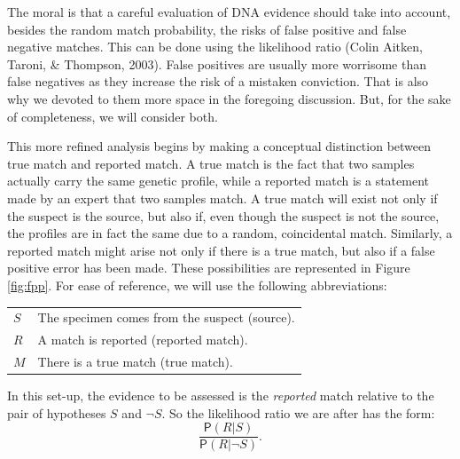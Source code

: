 \documentclass[
  10pt,
  dvipsnames,enabledeprecatedfontcommands]{scrartcl}
\newcommand{\pr}[1]{\mathsf{P}(#1)}
\begin{document}
The moral is that a careful evaluation of DNA evidence should take into
account, besides the random match probability, the risks of false
positive and false negative matches. This can be done using the
likelihood ratio (Colin Aitken, Taroni, \& Thompson, 2003). False
positives are usually more worrisome than false negatives as they
increase the risk of a mistaken conviction. That is also why we devoted
to them more space in the foregoing discussion. But, for the sake of
completeness, we will consider both.

This more refined analysis begins by making a conceptual distinction
between true match and reported match. A true match is the fact that two
samples actually carry the same genetic profile, while a reported match
is a statement made by an expert that two samples match. A true match
will exist not only if the suspect is the source, but also if, even
though the suspect is not the source, the profiles are in fact the same
due to a random, coincidental match. Similarly, a reported match might
arise not only if there is a true match, but also if a false positive
error has been made. These possibilities are represented in Figure
\ref{fig:fpp}. For ease of reference, we will use the following
abbreviations:

\begin{center} \hspace{10mm}
\begin{tabular}{lp{9cm}}
$S$ & The specimen comes from the suspect (source). \\
$R$ & A match is reported (reported match). \\
$M$ & There is a true match (true match).
\end{tabular}
\end{center}

\noindent  In this set-up, the evidence to be assessed is the
\textit{reported} match relative to the pair of hypotheses \(S\) and
\(\neg S\). So the likelihood ratio we are after has the form:
\[\frac{\pr{R \vert S}}{\pr{R \vert \neg S}}.\]
\end{document}
